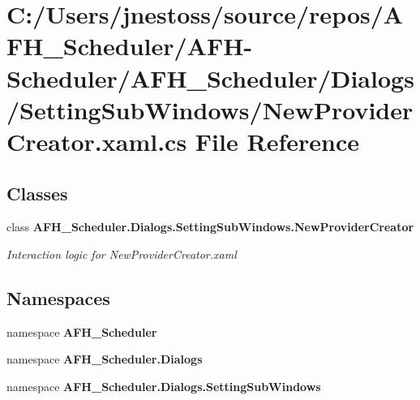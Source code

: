 \section{C\+:/\+Users/jnestoss/source/repos/\+A\+F\+H\+\_\+\+Scheduler/\+A\+F\+H-\/\+Scheduler/\+A\+F\+H\+\_\+\+Scheduler/\+Dialogs/\+Setting\+Sub\+Windows/\+New\+Provider\+Creator.xaml.\+cs File Reference}
\label{_new_provider_creator_8xaml_8cs}
\subsection*{Classes}
\begin{DoxyCompactItemize}
\item 
class \textbf{ A\+F\+H\+\_\+\+Scheduler.\+Dialogs.\+Setting\+Sub\+Windows.\+New\+Provider\+Creator}
\begin{DoxyCompactList}\small\item\em Interaction logic for New\+Provider\+Creator.\+xaml \end{DoxyCompactList}\end{DoxyCompactItemize}
\subsection*{Namespaces}
\begin{DoxyCompactItemize}
\item 
namespace \textbf{ A\+F\+H\+\_\+\+Scheduler}
\item 
namespace \textbf{ A\+F\+H\+\_\+\+Scheduler.\+Dialogs}
\item 
namespace \textbf{ A\+F\+H\+\_\+\+Scheduler.\+Dialogs.\+Setting\+Sub\+Windows}
\end{DoxyCompactItemize}
